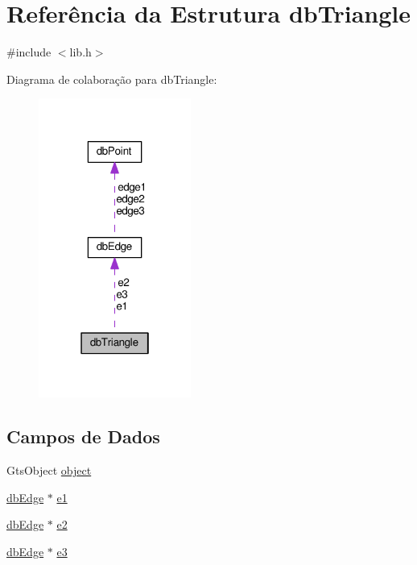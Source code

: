 \hypertarget{structdbTriangle}{}\section{Referência da Estrutura db\+Triangle}
\label{structdbTriangle}


{\ttfamily \#include $<$lib.\+h$>$}



Diagrama de colaboração para db\+Triangle\+:\nopagebreak
\begin{figure}[H]
\begin{center}
\leavevmode
\includegraphics[width=142pt]{structdbTriangle__coll__graph}
\end{center}
\end{figure}
\subsection*{Campos de Dados}
\begin{DoxyCompactItemize}
\item 
Gts\+Object \hyperlink{structdbTriangle_a4c9ad028a3c5d740f1fc0b15669c1c0f}{object}
\item 
\hyperlink{structdbEdge}{db\+Edge} $\ast$ \hyperlink{structdbTriangle_a038c41bf0720b16e63178f1915b0e455}{e1}
\item 
\hyperlink{structdbEdge}{db\+Edge} $\ast$ \hyperlink{structdbTriangle_a0b0a41cfaeb4cee2ad5d8578359c61c8}{e2}
\item 
\hyperlink{structdbEdge}{db\+Edge} $\ast$ \hyperlink{structdbTriangle_a5e66d5366546f4c9cd75c879bd054efd}{e3}
\end{DoxyCompactItemize}


